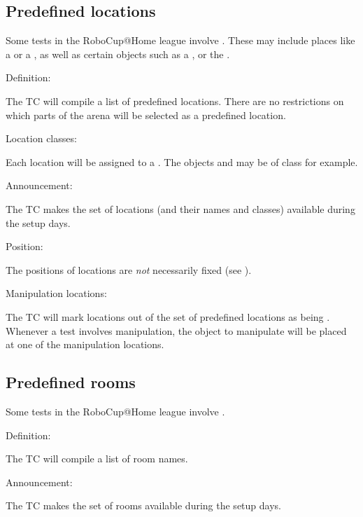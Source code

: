 \subsection{Predefined locations}
\label{rule:scenario_locations}

Some tests in the RoboCup@Home league involve . 
These may include places like a  or a , as well as certain objects such as a , or the . 

\begin{enumerate}
	{\bf\item Definition:} The TC will compile a list of predefined locations. There are no restrictions on which parts of the arena will be selected as a predefined location.

	{\bf\item Location classes:} Each location will be assigned to a . The objects  and  may be of class  for example. 

	{\bf\item Announcement:} The TC makes the set of locations (and their names and classes) available during the setup days.

	{\bf\item Position:} The positions of locations are \emph{not} necessarily fixed (see ).

	{\bf\item Manipulation locations:} The TC will mark \NumLocations locations out of the set of predefined locations as being . Whenever a test involves manipulation, the object to manipulate will be placed at one of the manipulation locations. 
\end{enumerate}



\subsection{Predefined rooms}
\label{rule:scenario_rooms}
Some tests in the RoboCup@Home league involve . 
\begin{enumerate}
	{\bf\item Definition:} The TC will compile a list of room names.
	{\bf\item Announcement:} The TC makes the set of rooms available during the setup days.
\end{enumerate}



